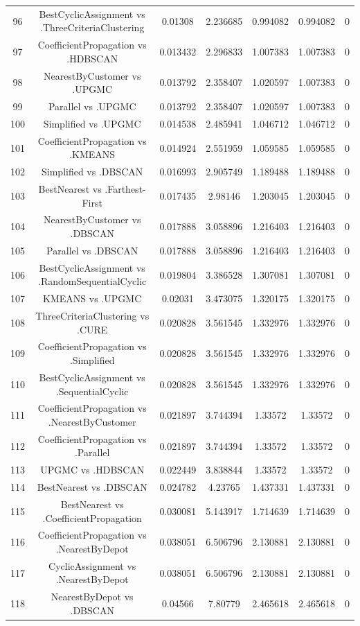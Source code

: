 \documentclass[a4paper,10pt]{article}
\begin{document}
\begin{landscape}
\begin{table}[!htp]
\begin{tabular}{ccccccc}
96&BestCyclicAssignment vs .ThreeCriteriaClustering&0.01308&2.236685&0.994082&0.994082&0\\
97&CoefficientPropagation vs .HDBSCAN&0.013432&2.296833&1.007383&1.007383&0\\
98&NearestByCustomer vs .UPGMC&0.013792&2.358407&1.020597&1.007383&0\\
99&Parallel vs .UPGMC&0.013792&2.358407&1.020597&1.007383&0\\
100&Simplified vs .UPGMC&0.014538&2.485941&1.046712&1.046712&0\\
101&CoefficientPropagation vs .KMEANS&0.014924&2.551959&1.059585&1.059585&0\\
102&Simplified vs .DBSCAN&0.016993&2.905749&1.189488&1.189488&0\\
103&BestNearest vs .Farthest-First&0.017435&2.98146&1.203045&1.203045&0\\
104&NearestByCustomer vs .DBSCAN&0.017888&3.058896&1.216403&1.216403&0\\
105&Parallel vs .DBSCAN&0.017888&3.058896&1.216403&1.216403&0\\
106&BestCyclicAssignment vs .RandomSequentialCyclic&0.019804&3.386528&1.307081&1.307081&0\\
107&KMEANS vs .UPGMC&0.02031&3.473075&1.320175&1.320175&0\\
108&ThreeCriteriaClustering vs .CURE&0.020828&3.561545&1.332976&1.332976&0\\
109&CoefficientPropagation vs .Simplified&0.020828&3.561545&1.332976&1.332976&0\\
110&BestCyclicAssignment vs .SequentialCyclic&0.020828&3.561545&1.332976&1.332976&0\\
111&CoefficientPropagation vs .NearestByCustomer&0.021897&3.744394&1.33572&1.33572&0\\
112&CoefficientPropagation vs .Parallel&0.021897&3.744394&1.33572&1.33572&0\\
113&UPGMC vs .HDBSCAN&0.022449&3.838844&1.33572&1.33572&0\\
114&BestNearest vs .DBSCAN&0.024782&4.23765&1.437331&1.437331&0\\
115&BestNearest vs .CoefficientPropagation&0.030081&5.143917&1.714639&1.714639&0\\
116&CoefficientPropagation vs .NearestByDepot&0.038051&6.506796&2.130881&2.130881&0\\
117&CyclicAssignment vs .NearestByDepot&0.038051&6.506796&2.130881&2.130881&0\\
118&NearestByDepot vs .DBSCAN&0.04566&7.80779&2.465618&2.465618&0\\

\end{tabular}
\end{table}
\end{landscape}
\end{document}
